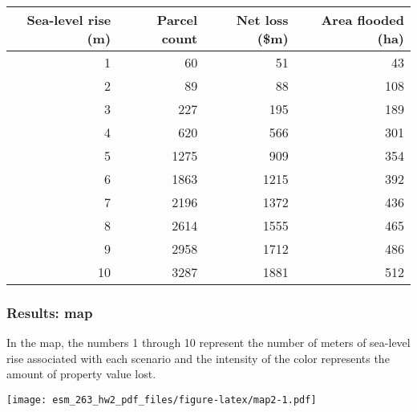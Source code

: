 \documentclass[
]{article}
\newenvironment{Shaded}{\begin{snugshade}}{\end{snugshade}}
\newcommand{\DataTypeTok}[1]{\textcolor[rgb]{0.13,0.29,0.53}{#1}}
\newcommand{\DecValTok}[1]{\textcolor[rgb]{0.00,0.00,0.81}{#1}}
\newcommand{\FloatTok}[1]{\textcolor[rgb]{0.00,0.00,0.81}{#1}}
\newcommand{\KeywordTok}[1]{\textcolor[rgb]{0.13,0.29,0.53}{\textbf{#1}}}
\newcommand{\NormalTok}[1]{#1}
\newcommand{\OperatorTok}[1]{\textcolor[rgb]{0.81,0.36,0.00}{\textbf{#1}}}
\newcommand{\StringTok}[1]{\textcolor[rgb]{0.31,0.60,0.02}{#1}}
\begin{document}
\begin{table}[H]
\centering
\begin{tabular}[t]{r|r|r|r}
\hline
Sea-level rise (m) & Parcel count & Net loss (\$m) & Area flooded (ha)\\
\hline
1 & 60 & 51 & 43\\
\hline
2 & 89 & 88 & 108\\
\hline
3 & 227 & 195 & 189\\
\hline
4 & 620 & 566 & 301\\
\hline
5 & 1275 & 909 & 354\\
\hline
6 & 1863 & 1215 & 392\\
\hline
7 & 2196 & 1372 & 436\\
\hline
8 & 2614 & 1555 & 465\\
\hline
9 & 2958 & 1712 & 486\\
\hline
10 & 3287 & 1881 & 512\\
\hline
\end{tabular}
\end{table}

\hypertarget{results-map}{%
\subsubsection{Results: map}\label{results-map}}

In the map, the numbers 1 through 10 represent the number of meters of
sea-level rise associated with each scenario and the intensity of the
color represents the amount of property value lost.

\begin{Shaded}
\end{Shaded}

\texttt{[image: esm\_263\_hw2\_pdf\_files/figure-latex/map2-1.pdf]}
\end{document}
